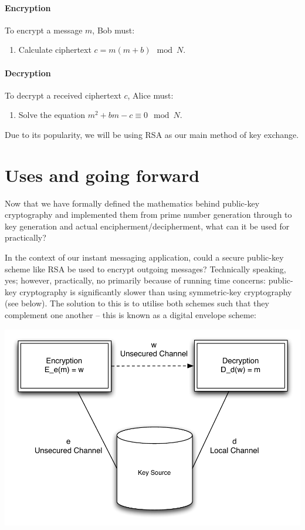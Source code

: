   \paragraph{Encryption}
  
  To encrypt a message $m$, Bob must:
  
  \begin{enumerate}
    \item Calculate ciphertext $c = m(m+b) \mod N$.
  \end{enumerate}
  
  \paragraph{Decryption}
  
  To decrypt a received ciphertext $c$, Alice must:
  
  \begin{enumerate}
    \item Solve the equation $m^2 + bm -c \equiv 0 \mod N$.
  \end{enumerate}
    
Due to its popularity, we will be using RSA as our main method of key exchange.

\section{Uses and going forward}

Now that we have formally defined the mathematics behind public-key cryptography and implemented them from prime number generation through to key generation and actual encipherment/decipherment, what can it be used for practically? 

In the context of our instant messaging application, could a secure public-key scheme like RSA be used to encrypt outgoing messages? Technically speaking, yes; however, practically, no primarily because of running time concerns: public-key cryptography is significantly slower than using symmetric-key cryptography (see below). The solution to this is to utilise both schemes such that they complement one another -- this is known as a digital envelope scheme:

\begin{center}
  \includegraphics[scale=0.6]{./Figures/3-7a.pdf}
\end{center}

